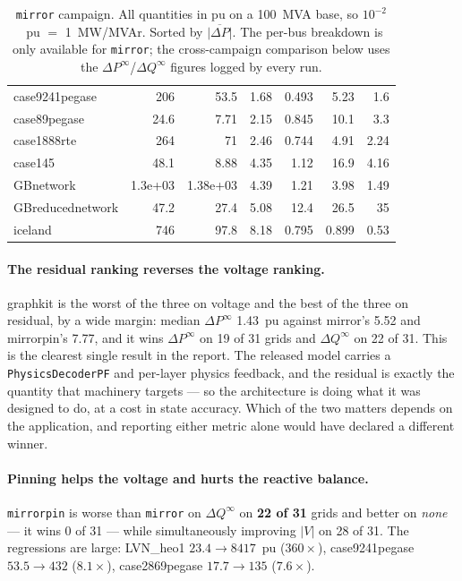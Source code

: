 \documentclass[10pt]{article}
\begin{document}
\begin{table}[H]
\begin{tabular}{lrrrrrr}
case9241pegase & 206 & 53.5 & 1.68 & 0.493 & 5.23 & 1.6 \\
case89pegase & 24.6 & 7.71 & 2.15 & 0.845 & 10.1 & 3.3 \\
case1888rte & 264 & 71 & 2.46 & 0.744 & 4.91 & 2.24 \\
case145 & 48.1 & 8.88 & 4.35 & 1.12 & 16.9 & 4.16 \\
GBnetwork & 1.3e+03 & 1.38e+03 & 4.39 & 1.21 & 3.98 & 1.49 \\
GBreducednetwork & 47.2 & 27.4 & 5.08 & 12.4 & 26.5 & 35 \\
iceland & 746 & 97.8 & 8.18 & 0.795 & 0.899 & 0.53 \\
\bottomrule
\end{tabular}
\caption{\texttt{mirror} campaign. All quantities in pu on a 100~MVA base, so
$10^{-2}$~pu $=$ 1~MW/MVAr. Sorted by $\overline{|\Delta P|}$. The per-bus
breakdown is only available for \texttt{mirror}; the cross-campaign comparison
below uses the $\Delta P^{\infty}$/$\Delta Q^{\infty}$ figures logged by every
run.}
\end{table}

\paragraph{The residual ranking reverses the voltage ranking.} graphkit is the
worst of the three on voltage and the best of the three on residual, by a wide
margin: median $\Delta P^{\infty}$ 1.43~pu against mirror's 5.52 and
mirrorpin's 7.77, and it wins $\Delta P^{\infty}$ on 19 of 31 grids and
$\Delta Q^{\infty}$ on 22 of 31. This is the clearest single result in the
report. The released model carries a \texttt{PhysicsDecoderPF} and per-layer
physics feedback, and the residual is exactly the quantity that machinery
targets --- so the architecture is doing what it was designed to do, at a cost
in state accuracy. Which of the two matters depends on the application, and
reporting either metric alone would have declared a different winner.

\paragraph{Pinning helps the voltage and hurts the reactive balance.}
\texttt{mirrorpin} is worse than \texttt{mirror} on $\Delta Q^{\infty}$ on
\textbf{22 of 31} grids and better on \emph{none} --- it wins 0 of 31 --- while
simultaneously improving $|V|$ on 28 of 31. The regressions are large:
LVN\_heo1 $23.4\rightarrow8417$~pu ($360\times$), case9241pegase
$53.5\rightarrow432$ ($8.1\times$), case2869pegase $17.7\rightarrow135$
($7.6\times$).
\end{document}
